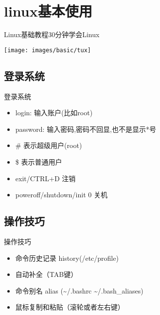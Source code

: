 \section{linux基本使用}

\begin{frame}{Linux基础教程}{30分钟学会Linux}

\begin{center}
\texttt{[image: images/basic/tux]}
\end{center}
\end{frame}


\subsection{登录系统}


\begin{frame}{登录系统}
\begin{itemize}
\item login: 输入账户(比如root)
\item password: 输入密码,密码不回显,也不是显示{*}号
\item \# 表示超级用户(root)
\item \$ 表示普通用户
\item exit/CTRL+D 注销
\item poweroff/shutdown/init 0 关机
\end{itemize}

\end{frame}

\subsection{操作技巧}


\begin{frame}{操作技巧}
\begin{itemize}
\item 命令历史记录 history(/etc/profile)


\pause{\noindent }

\item 自动补全（TAB键）


\pause{}

\item 命令别名 alias (\textasciitilde{}/.bashrc \textasciitilde{}/.bash\_aliases)


\pause{}

\item 鼠标复制和粘贴（滚轮或者左右键）
\end{itemize}

\end{frame}

